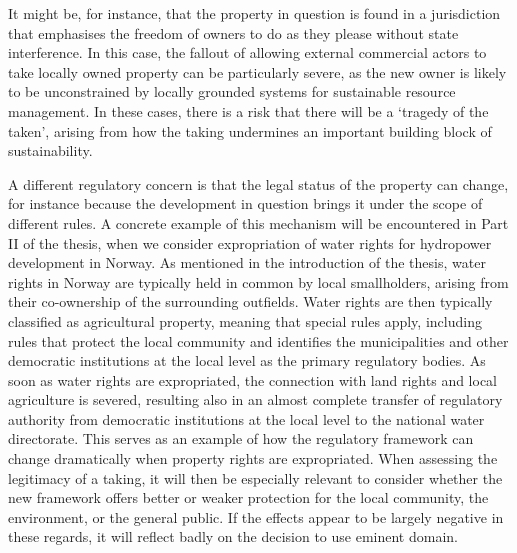 It might be, for instance, that the property in question is found in a jurisdiction that emphasises  the freedom of owners to do as they please without state interference. In this case, the fallout of allowing external commercial actors to take locally owned property can be particularly severe, as the new owner is likely to be unconstrained by locally grounded systems for sustainable resource management. In these cases, there is a risk that there will be a `tragedy of the taken', arising from how the taking undermines an important building block of sustainability. 


A different regulatory concern is that the legal status of the property can change, for instance because the development in question brings it under the scope of different rules. A concrete example of this mechanism will be encountered in Part II of the thesis, when we consider expropriation of water rights for hydropower development in Norway. As mentioned in the introduction of the thesis, water rights in Norway are typically held in common by local smallholders, arising from their co-ownership of the surrounding outfields. Water rights are then typically classified as agricultural property, meaning that special rules apply, including rules that protect the local community and identifies the municipalities and other democratic institutions at the local level as the primary regulatory bodies. As soon as water rights are expropriated, the connection with land rights and local agriculture is severed, resulting also in an almost complete transfer of regulatory authority from democratic institutions at the local level to the national water directorate. This serves as an example of how the regulatory framework can change dramatically when property rights are expropriated. When assessing the legitimacy of a taking, it will then be especially relevant to consider whether the new framework offers better or weaker protection for the local community, the environment, or the general public. If the effects appear to be largely negative in these regards, it will reflect badly on the decision to use eminent domain.%

